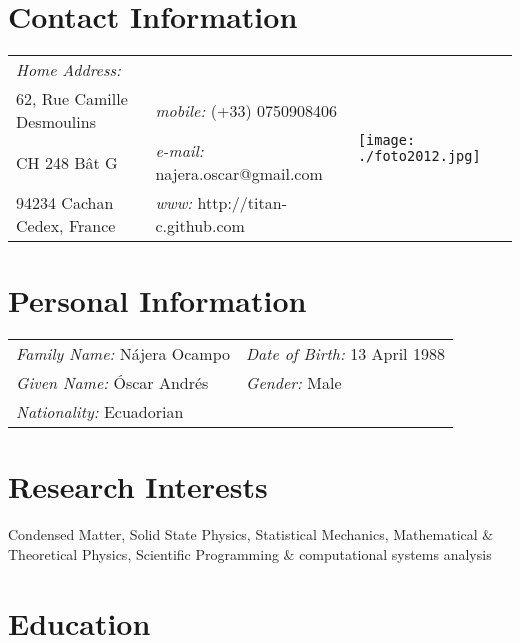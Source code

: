 \documentclass[margin,line]{res}
\newenvironment{list1}{
  \begin{list}{\ding{113}}{%
      \setlength{\itemsep}{0in}
      \setlength{\parsep}{0in} \setlength{\parskip}{0in}
      \setlength{\topsep}{0in} \setlength{\partopsep}{0in} 
      \setlength{\leftmargin}{0.17in}}}{\end{list}}
\begin{document}

\begin{resume}

\section{\sc Contact Information}
  \begin{tabular}{@{}p{2in}p{2.5in}p{3cm} }
    {\it Home Address:}    &  &
      \multirow{4}{*}{ \texttt{[image: ./foto2012.jpg]}}\\

    62, Rue Camille Desmoulins & {\it mobile:} (+33) 0750908406 \\
    CH 248 Bât G      & {\it e-mail:}  najera.oscar@gmail.com\\
    94234 Cachan Cedex, France    & {\it www:} http://titan-c.github.com
  \end{tabular}\vspace{0.5cm}

\section{\sc Personal Information}
 \begin{tabular}{ll}
  {\it Family Name:} Nájera Ocampo & {\it Date of Birth:} 13 April 1988\\
  {\it Given Name:} Óscar Andrés   & {\it Gender:} Male\\
  {\it Nationality:} Ecuadorian    & %
 \end{tabular}

\section{\sc Research Interests}
  Condensed Matter, Solid State Physics, Statistical Mechanics, Mathematical \& Theoretical Physics, Scientific Programming \& computational systems analysis

\section{\sc Education}


\end{resume}
\end{document}
